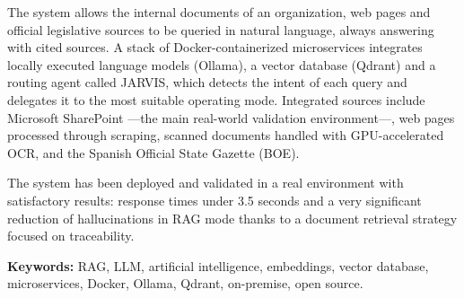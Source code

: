 The system allows the internal documents of an organization, web pages and official legislative sources to be queried in natural language, always answering with cited sources. A stack of Docker-containerized microservices integrates locally executed language models (Ollama), a vector database (Qdrant) and a routing agent called JARVIS, which detects the intent of each query and delegates it to the most suitable operating mode. Integrated sources include Microsoft SharePoint ---the main real-world validation environment---, web pages processed through scraping, scanned documents handled with GPU-accelerated OCR, and the Spanish Official State Gazette (BOE).

The system has been deployed and validated in a real environment with satisfactory results: response times under 3.5 seconds and a very significant reduction of hallucinations in RAG mode thanks to a document retrieval strategy focused on traceability.

\vspace{0.5cm}
\noindent\textbf{Keywords:} RAG, LLM, artificial intelligence, embeddings, vector database, microservices, Docker, Ollama, Qdrant, on-premise, open source.

\newpage

